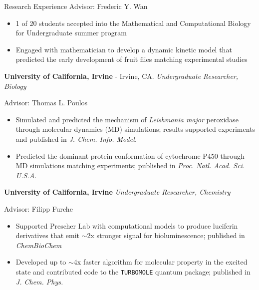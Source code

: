 \begin{rubric}{Research Experience}
  Advisor: Frederic Y. Wan
  \vspace{-0.5em}
  \begin{itemize}
  \itemsep-0.5em
  \item 1 of 20 students accepted into the Mathematical and Computational Biology for Undergraduate
    summer program
  \item Engaged with mathematician to develop a dynamic kinetic model that predicted the early
    development of fruit flies matching experimental studies
  \end{itemize}
  \textbf{University of California, Irvine} - Irvine, CA.
  \textit{Undergraduate Researcher, Biology}

  Advisor: Thomas L. Poulos
  \vspace{-0.5em}
  \begin{itemize}
  \itemsep-0.5em
  \item Simulated and predicted the mechanism of \textit{Leishmania major} peroxidase through
    molecular dynamics (MD) simulations; results supported experiments and published in
    \textit{J. Chem. Info. Model.}
  \item Predicted the dominant protein conformation of cytochrome P450 through
    MD simulations matching experiments; published in \textit{Proc. Natl. Acad. Sci. U.S.A.}
  \end{itemize}
  \textbf{University of California, Irvine}
  \textit{Undergraduate Researcher, Chemistry}

  Advisor: Filipp Furche
  \vspace{-0.5em}
  \begin{itemize}
  \itemsep-0.5em
  \item Supported Prescher Lab with computational models to produce luciferin derivatives that emit
    $\sim$2x stronger signal for bioluminescence; published in \textit{ChemBioChem}
  \item Developed up to $\sim$4x faster algorithm for molecular property in the excited
    state and contributed code to the \texttt{TURBOMOLE} quantum package; published in
    \textit{J. Chem. Phys.}
  \end{itemize}
\end{rubric}
